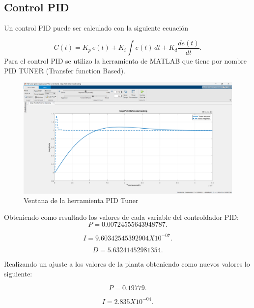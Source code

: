 \documentclass[12pt]{article}
\begin{document}
	\subsection{Control PID}
	
	
	
	Un control PID puede ser calculado con la siguiente ecuación 
	
	\begin{equation}
		C(t) = K_p \, e(t) + K_i \int e(t) \, dt + K_d \frac{d e(t)}{dt}.
	\end{equation}
	Para el control PID se utilizo la herramienta de MATLAB que tiene por nombre PID TUNER (Transfer function Based).
	
	\begin{figure}[h!]
		\centering
		\includegraphics[width=0.7\linewidth]{imagenes/pid tuner}
		\caption{Ventana de la herramienta PID Tuner}
		\label{fig:pid-tuner}
	\end{figure}
	
	Obteniendo como resultado los valores de cada variable del controldador PID:
	\begin{equation}
		P=0.00724555643948787 .
	\end{equation}
	
	\begin{equation}
		I=9.60342545392904 X 10^{-07}.
	\end{equation}
	
	\begin{equation}
		D=5.63241452981354.
	\end{equation}
	
	Realizando un ajuste a los valores de la planta obteniendo como nuevos valores lo siguiente:
	
	\begin{equation}
		P=0.19779.
	\end{equation}
	
	\begin{equation}
		I=2.835 X 10^{-04}.
	\end{equation}
	
\end{document}

